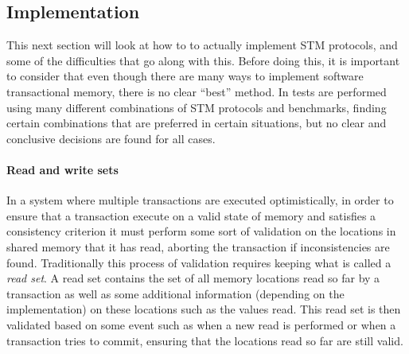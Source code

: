 

\subsection{Implementation}
This next section will look at how to to actually implement STM protocols, and some
 of the difficulties that go along with this.
Before doing this, it is important to consider that even though there are many ways to implement software transactional memory, there is no clear ``best''
method.
In \cite{1123001}
tests are performed using many different combinations of STM protocols and benchmarks, finding certain combinations that are
preferred in certain situations, but no clear and conclusive decisions are found for all cases.


\paragraph{Read and write sets}
In a system where multiple transactions are executed optimistically,
in order to ensure that a transaction execute on a valid state of memory and satisfies
a consistency criterion it must perform some sort of validation on the locations in shared memory that it has read,
aborting the transaction if inconsistencies are found.
Traditionally this process of validation requires keeping what is called a \emph{read set}.
A read set contains the set of all memory locations read so far by a transaction as well as some additional information
(depending on the implementation) on these locations such as the values read.
This read set is then validated based on some event such as when a new read is performed or when a transaction tries to commit,
 ensuring that the locations read so far are still valid.


